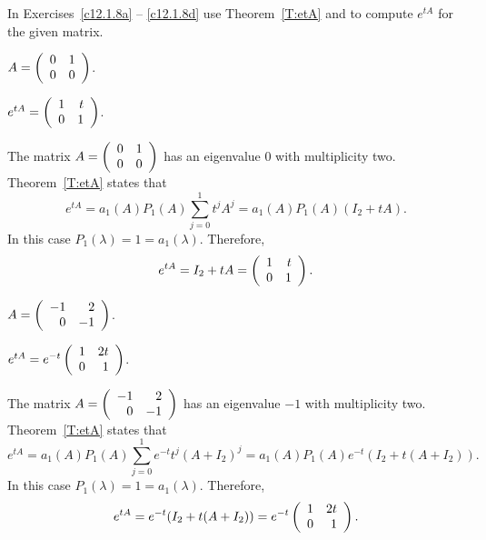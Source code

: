 \documentclass{ximera}
\begin{document}
\noindent  In Exercises~\ref{c12.1.8a} -- \ref{c12.1.8d} use
Theorem~\ref{T:etA} and \Matlab to compute $e^{tA}$ for the given matrix.
\begin{exercise} \label{c12.1.8a}
$A = \left(\begin{array}{rr} 0 & 1\\ 0 &0\end{array}\right)$.

\begin{solution}
\ans $e^{tA} = \left(\begin{array}{rr} 1 & t\\ 0 &1\end{array}\right)$.

\soln The matrix $A = \left(\begin{array}{rr} 0 & 1\\ 0 &0\end{array}\right)$ has an eigenvalue $0$ with
multiplicity two.  Theorem~\ref{T:etA} states that 
\[
e^{tA} = a_1(A)P_1(A)\sum_{j=0}^1t^jA^j= a_1(A)P_1(A)(I_2+tA).
\]
In this case $P_1(\lambda)=1=a_1(\lambda)$.   Therefore,
\[
e^{tA} = I_2+tA = \left(\begin{array}{rr} 1 & t\\ 0 &1\end{array}\right).
\]


\end{solution}
\end{exercise}
\begin{exercise} \label{c12.1.8b}
$A = \left(\begin{array}{rr} -1 & 2\\ 0 &-1\end{array}\right)$.

\begin{solution}
\ans $e^{tA} = e^{-t}\left(\begin{array}{rr} 1 & 2t\\ 0 &1\end{array}\right)$.

\soln The matrix $A = \left(\begin{array}{rr} -1 & 2\\ 0 &-1\end{array}\right)$ has an eigenvalue $-1$ with
multiplicity two.  Theorem~\ref{T:etA} states that 
\[
e^{tA} = a_1(A)P_1(A)\sum_{j=0}^1e^{-t}t^j(A+I_2)^j=
a_1(A)P_1(A)e^{-t}(I_2+t(A+I_2)).
\]
In this case $P_1(\lambda)=1=a_1(\lambda)$.   Therefore,
\[
e^{tA} = e^{-t}(I_2+t(A+I_2)) = e^{-t}\left(\begin{array}{rr} 1 & 2t\\ 0 &1\end{array}\right).
\]


\end{solution}
\end{exercise}
\end{document}
